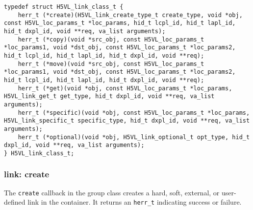 \begin{lstlisting}[caption={Structure for link callback routines, H5VLconnector.h}, captionpos=b, label={lst:H5Lclass}]
typedef struct H5VL_link_class_t {                                               
    herr_t (*create)(H5VL_link_create_type_t create_type, void *obj, const H5VL_loc_params_t *loc_params, hid_t lcpl_id, hid_t lapl_id, hid_t dxpl_id, void **req, va_list arguments);
    herr_t (*copy)(void *src_obj, const H5VL_loc_params_t *loc_params1, void *dst_obj, const H5VL_loc_params_t *loc_params2, hid_t lcpl_id, hid_t lapl_id, hid_t dxpl_id, void **req);           
    herr_t (*move)(void *src_obj, const H5VL_loc_params_t *loc_params1, void *dst_obj, const H5VL_loc_params_t *loc_params2, hid_t lcpl_id, hid_t lapl_id, hid_t dxpl_id, void **req);           
    herr_t (*get)(void *obj, const H5VL_loc_params_t *loc_params, H5VL_link_get_t get_type, hid_t dxpl_id, void **req, va_list arguments);                 
    herr_t (*specific)(void *obj, const H5VL_loc_params_t *loc_params, H5VL_link_specific_t specific_type, hid_t dxpl_id, void **req, va_list arguments);            
    herr_t (*optional)(void *obj, H5VL_link_optional_t opt_type, hid_t dxpl_id, void **req, va_list arguments); 
} H5VL_link_class_t;   
\end{lstlisting}


\subsubsection{link: create}
The \texttt{create} callback in the group class creates a hard,
soft, external, or user-defined link in the container. It returns an
\texttt{herr\_t} indicating success or failure.\bigskip

